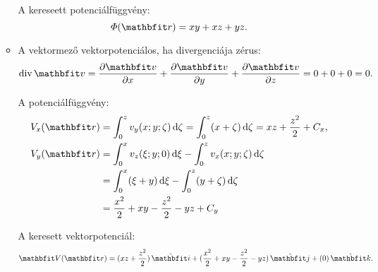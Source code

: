 \documentclass{szb-solution}
\begin{document}
\begin{enumerate}[a)]
\begin{itemize}
                A kereseett potenciálfüggvény:
                $$
                  \varPhi (\coordvec)
                  =
                  xy + xz + yz
                  \text.
                $$

          \item A vektormező vektorpotenciálos, ha divergenciája zérus:
                $$
                  \Div \rvec v
                  =
                  \pdv{\rvec v}{x} + \pdv{\rvec v}{y} + \pdv{\rvec v}{z}
                  =
                  0 + 0 + 0
                  =
                  0
                  \text.
                $$

                A potenciálfüggvény:
                \begin{align*}
                  V_x(\coordvec)
                   & =
                  \int_0^z v_y(x; y; \zeta) \dd \zeta
                  =
                  \int_0^z (x + \zeta) \dd \zeta
                  =
                  xz + \frac{z^2}{2} + C_x
                  \text,
                  \\
                  V_y(\coordvec)
                   & =
                  \int_0^x v_z(\xi; y; 0) \dd \xi -
                  \int_0^z v_x(x; y; \zeta) \dd \zeta
                  \\
                   & =
                  \int_0^x (\xi + y) \dd \xi -
                  \int_0^z (y + \zeta) \dd \zeta
                  \\
                   & =
                  \frac{x^2}{2} + xy -
                  \frac{z^2}{2} - yz + C_y
                \end{align*}

                A keresett vektorpotenciál:
                $$
                  \rvec V(\coordvec)
                  =
                  \ijk{xz + \frac{z^2}{2}}
                  {\frac{x^2}{2} + xy - \frac{z^2}{2} - yz}
                  {0}
                  \text.
                $$
        \end{itemize}


\end{enumerate}
\end{document}
